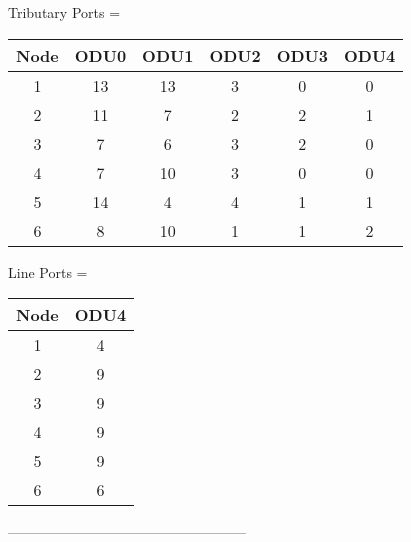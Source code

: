 Tributary Ports =\\

\begin{tabular}{|c|c|c|c|c|c|}
  \hline
  Node & ODU0 & ODU1 & ODU2 & ODU3 & ODU4 \\
  \hline\hline
  1 & 13 & 13 & 3 & 0 & 0 \\
  2 & 11 & 7 & 2 & 2 & 1 \\
  3 & 7 & 6 & 3 & 2 & 0 \\
  4 & 7 & 10 & 3 & 0 & 0 \\
  5 & 14 & 4 & 4 & 1 & 1 \\
  6 & 8 & 10 & 1 & 1 & 2 \\
  \hline
\end{tabular}

\vspace{15pt}


Line Ports = \\


\begin{tabular}{|c|c|}
  \hline
  Node & ODU4 \\
  \hline\hline
  1 & 4 \\
  2 & 9 \\
  3 & 9 \\
  4 & 9 \\
  5 & 9 \\
  6 & 6 \\
  \hline
\end{tabular}

\vspace{11pt}

---------------------------------------------------\\

